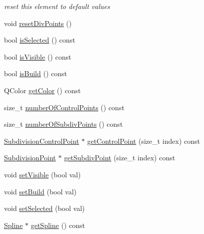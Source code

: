 \begin{DoxyCompactItemize}
\begin{DoxyCompactList}\small\item\em reset this element to default values \end{DoxyCompactList}\item 
void \hyperlink{classShipCAD_1_1SubdivisionControlCurve_a34e280e9ba6e6705577d1afd229e9f20}{reset\+Div\+Points} ()
\item 
bool \hyperlink{classShipCAD_1_1SubdivisionControlCurve_ae4a8eda1eb14cc85f336aa6b2d10753b}{is\+Selected} () const 
\item 
bool \hyperlink{classShipCAD_1_1SubdivisionControlCurve_a5ed850eb8b536f4f534adca1c9a3aca0}{is\+Visible} () const 
\item 
bool \hyperlink{classShipCAD_1_1SubdivisionControlCurve_ab1f7193c8129646d289aebf5d2d58ef7}{is\+Build} () const 
\item 
Q\+Color \hyperlink{classShipCAD_1_1SubdivisionControlCurve_a800e0d38d3cdbdc6a38aa989b5fdb3ff}{get\+Color} () const 
\item 
size\+\_\+t \hyperlink{classShipCAD_1_1SubdivisionControlCurve_ae5fbcecbf686e25e28a6b418719e8ecb}{number\+Of\+Control\+Points} () const 
\item 
size\+\_\+t \hyperlink{classShipCAD_1_1SubdivisionControlCurve_a15005a440eec6919d9fae9ff92cdf566}{number\+Of\+Subdiv\+Points} () const 
\item 
\hyperlink{classShipCAD_1_1SubdivisionControlPoint}{Subdivision\+Control\+Point} $\ast$ \hyperlink{classShipCAD_1_1SubdivisionControlCurve_a40ad888b65a29ca25d39a15f37cb53c0}{get\+Control\+Point} (size\+\_\+t index) const 
\item 
\hyperlink{classShipCAD_1_1SubdivisionPoint}{Subdivision\+Point} $\ast$ \hyperlink{classShipCAD_1_1SubdivisionControlCurve_ad34aef8d1a8bd36a68299d3eca67d056}{get\+Subdiv\+Point} (size\+\_\+t index) const 
\item 
void \hyperlink{classShipCAD_1_1SubdivisionControlCurve_ac536de424624a4ae312029fe643f4b61}{set\+Visible} (bool val)
\item 
void \hyperlink{classShipCAD_1_1SubdivisionControlCurve_afb98b225e0dc255272a69e96c14eedb7}{set\+Build} (bool val)
\item 
void \hyperlink{classShipCAD_1_1SubdivisionControlCurve_abaf7f7cfec21eedacf55b1654f3e7f2f}{set\+Selected} (bool val)
\item 
\hyperlink{classShipCAD_1_1Spline}{Spline} $\ast$ \hyperlink{classShipCAD_1_1SubdivisionControlCurve_af40e4673307d023a6763e0ba64fd47dd}{get\+Spline} () const 

\end{DoxyCompactItemize}
